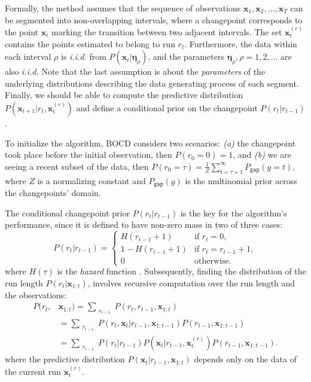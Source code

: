 \documentclass[Afour,sageh,times]{sagej}
\theoremstyle{lemma}
\begin{document}
Formally, the method assumes that the sequence of observations $\boldsymbol{x}_1, \boldsymbol{x}_2, \dots, \boldsymbol{x}_T$ can be segmented into non-overlapping intervals, where a changepoint corresponds to the point $\boldsymbol{x}_i$ marking the transition between two adjacent intervals. The set $\boldsymbol{x}_t^{(r)}$ contains the points estimated to belong to run $r_t$. Furthermore, the data within each interval $\rho$ is \textit{i.i.d.} from $P(\boldsymbol{x}_t | \boldsymbol{\eta}_\rho)$, and the parameters $\boldsymbol{\eta}_\rho, \rho = 1, 2, \dots$ are also \textit{i.i.d.} Note that the last assumption is about the \textit{parameters} of the underlying distributions describing the data generating process of each segment. Finally, we should be able to compute the predictive distribution $P(\boldsymbol{x}_{t+1} | r_t, \boldsymbol{x}_t^{(r)})$ and define a conditional prior on the changepoint $P(r_t | r_{t-1})$.

To initialize the algorithm, BOCD considers two scenarios: \textit{(a)} the changepoint took place before the initial observation, then $P(r_0 = 0) = 1$, and \textit{(b)} we are seeing a recent subset of the data, then $P(r_0 = \tau) = \frac{1}{Z} \sum_{t = \tau + 1}^{\infty} P_{\mathtt{gap}}(g=t)$, where $Z$ is a normalizing constant and $P_{\mathtt{gap}}(g)$ is the multinomial prior across the changepoints' domain. 

The conditional changepoint prior $P(r_t | r_{t-1})$ is the key for the algorithm's performance, since it is defined to have non-zero mass in two of three cases: 
\begin{equation}
    P(r_t | r_{t-1}) = \begin{cases}
         H(r_{t-1} + 1) &\text{if } r_t = 0, \\
         1 - H(r_{t-1} + 1) &\text{if } r_t = r_{t-1} +1, \\
         0 &\text{otherwise}.
    \end{cases}  %
\end{equation}
where $H(\tau)$ is the \textit{hazard} function \cite[]{forbes2011statistical}. Subsequently, finding the distribution of the run length $P(r_t | \boldsymbol{x}_{1:t})$, involves recursive computation over the run length and the observations: 
\begin{align} \label{eq:joint-runlen-obs}
    P(r_t, &\boldsymbol{x}_{1:t}) = \sum_{\substack{r_{t-1}}} P(r_t, r_{t-1}, \boldsymbol{x}_{1:t}) \\ 
    &= \sum_{\substack{r_{t-1}}} P(r_t, \boldsymbol{x}_t | r_{t-1}, \boldsymbol{x}_{1:t-1}) P(r_{t-1}, \boldsymbol{x}_{1:t-1}) \nonumber \\ &= \sum_{\substack{r_{t-1}}} P(r_t | r_{t-1}) P(\boldsymbol{x}_t | r_{t-1}, \boldsymbol{x}_t^{(r)}) P(r_{t-1}, \boldsymbol{x}_{1:t-1}). \nonumber
\end{align} where the predictive distribution $P(\boldsymbol{x}_t | r_{t-1}, \boldsymbol{x}_{1:t})$ depends only on the data of the current run $\boldsymbol{x}_t^{(r)}$.
\end{document}
